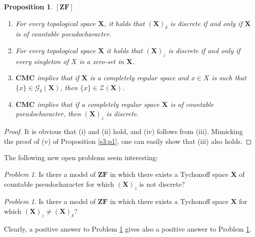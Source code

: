 \documentclass[12pt,twoside,leqno]{article}
\theoremstyle{plain}
\newtheorem{proposition}[theorem]{Proposition}
\theoremstyle{definition}
\theoremstyle{remark}
\newtheorem{problem}[theorem]{Problem}
\begin{document}
\begin{proposition}
	\label{s3:p6}
	$[\mathbf{ZF}]$
	\begin{enumerate}
		\item[(i)] For every topological space $\mathbf{X}$, it holds that $(\mathbf{X})_{\delta}$ is discrete if and only if $\mathbf{X}$ is of countable pseudocharacter.
		\item[(ii)] For every topological space $\mathbf{X}$ it holds that $(\mathbf{X})_z$ is discrete if and only if every singleton of $X$ is a zero-set in $\mathbf{X}$.
		
		\item[(iii)] $\mathbf{CMC}$ implies that if $\mathbf{X}$ is a completely regular space and $x\in X$ is such that $\{x\}\in\mathcal{G}_{\delta}(\mathbf{X})$, then $\{x\}\in\mathcal{Z}(\mathbf{X})$.
		
		\item[(iv)] $\mathbf{CMC}$ implies that if a completely regular space $\mathbf{X}$ is of countable pseudocharacter, then $(\mathbf{X})_z$ is discrete. 
		
	\end{enumerate}
\end{proposition}

\begin{proof}
	It is obvious that (i) and (ii) hold, and (iv) follows from (iii). Mimicking the proof of (v) of Proposition \ref{s3:p1}, one can easily show that (iii) also holds.
\end{proof}

The following new open problems seem interesting:

\begin{problem}
	\label{s3:q7}
	Is there a model of $\mathbf{ZF}$ in which there exists a Tychonoff space $\mathbf{X}$ of countable pseudocharacter for which $(\mathbf{X})_z$ is not discrete?
\end{problem}

\begin{problem}
	\label{s3:q8}
	Is there a model of $\mathbf{ZF}$ in which there exists a Tychonoff space $\mathbf{X}$ for which $(\mathbf{X})_z\neq (\mathbf{X})_{\delta}$?
\end{problem}

Clearly, a positive answer to Problem \ref{s3:q7} gives also a positive answer to Problem \ref{s3:q8}.
\end{document}
